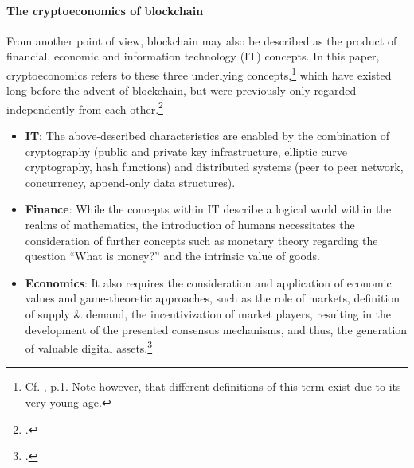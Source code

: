 \paragraph{The cryptoeconomics of blockchain} From another point of view, blockchain may also be described as the product of financial, economic and information technology (IT) concepts. In this paper, cryptoeconomics refers to these three underlying concepts,\footnote{Cf. \cite{BabbittCryptoeconomicDesignProposed2015}, p.1. Note however, that different definitions of this term exist due to its very young age.}  which have existed long before the advent of blockchain, but were previously only regarded independently from each other.\footcites[Cf.][p.2]{DavidsonEconomicsBlockchain2016}[cf.][p.21]{AntonopolousAndreasM..2017}[cf.][p.110]{RabahDigitalCryptoeconomicsPowered2017}
\begin{itemize}[noitemsep]
    \item \textbf{IT}: The above-described characteristics are enabled by the combination of cryptography (public and private key infrastructure, elliptic curve cryptography, hash functions) and distributed systems (peer to peer network, concurrency, append-only data structures).
    \item \textbf{Finance}: While the concepts within IT describe a logical world within the realms of mathematics, the introduction of humans necessitates the consideration of further concepts such as monetary theory regarding the question \enquote{What is money?} and the intrinsic value of goods.
    \item \textbf{Economics}: It also requires the consideration and application of economic values and game-theoretic approaches, such as the role of markets, definition of supply \& demand, the incentivization of market players, resulting in the development of the presented consensus mechanisms, and thus, the generation of valuable digital assets.\footcite[Cf.][\textit{Cryptoeconomics}]{BashirMasteringBlockchainSecond2018}
\end{itemize}



